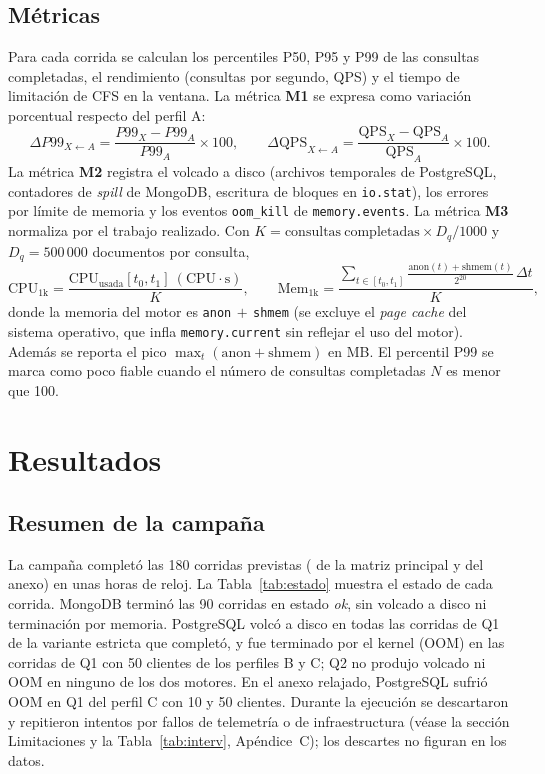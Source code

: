 \documentclass[12pt,letterpaper]{article}
\newcommand{\code}[1]{\texttt{#1}}
\newcommand{\Mongo}{MongoDB}
\newcommand{\PG}{PostgreSQL}
\begin{document}
\subsection{Métricas}
Para cada corrida se calculan los percentiles P50, P95 y P99 de las consultas completadas, el rendimiento
(consultas por segundo, QPS) y el tiempo de limitación de CFS en la ventana. La métrica \textbf{M1}
se expresa como variación porcentual respecto del perfil A:
\begin{equation}
\Delta P99_{X\leftarrow A}=\frac{P99_X-P99_A}{P99_A}\times 100,\qquad
\Delta\mathrm{QPS}_{X\leftarrow A}=\frac{\mathrm{QPS}_X-\mathrm{QPS}_A}{\mathrm{QPS}_A}\times 100.
\end{equation}
La métrica \textbf{M2} registra el volcado a disco (archivos temporales de \PG{}, contadores de \textit{spill} de
\Mongo{}, escritura de bloques en \code{io.stat}), los errores por límite de memoria y los eventos \code{oom\_kill}
de \code{memory.events}. La métrica \textbf{M3} normaliza por el trabajo realizado. Con $K=\mathrm{consultas\ completadas}\times D_q/1000$
y $D_q=500\,000$ documentos por consulta,
\begin{equation}
\mathrm{CPU}_{1\mathrm{k}}=\frac{\mathrm{CPU}_{\mathrm{usada}}[t_0,t_1]\ (\mathrm{CPU{\cdot}s})}{K},\qquad
\mathrm{Mem}_{1\mathrm{k}}=\frac{\sum_{t\in[t_0,t_1]}\frac{\mathrm{anon}(t)+\mathrm{shmem}(t)}{2^{20}}\,\Delta t}{K},
\end{equation}
donde la memoria del motor es \code{anon}$\,+\,$\code{shmem} (se excluye el \textit{page cache} del sistema operativo, que
infla \code{memory.current} sin reflejar el uso del motor). Además se reporta el pico $\max_t(\mathrm{anon}+\mathrm{shmem})$ en MB.
El percentil P99 se marca como poco fiable cuando el número de consultas completadas $N$ es menor que 100.

\section{Resultados}
\subsection{Resumen de la campaña}
La campaña completó las 180 corridas previstas ( de la matriz principal y  del anexo)
en unas  horas de reloj. La Tabla~\ref{tab:estado} muestra el estado de cada corrida. \Mongo{} terminó
las 90 corridas en estado \textit{ok}, sin volcado a disco ni terminación por memoria. \PG{} volcó a disco en todas
las corridas de Q1 de la variante estricta que completó, y fue terminado por el kernel (OOM) en las corridas de Q1 con 50 clientes de los perfiles B y C;
Q2 no produjo volcado ni OOM en ninguno de los dos motores. En el anexo relajado, \PG{} sufrió OOM en Q1 del perfil C con 10 y 50 clientes. Durante la
ejecución se descartaron y repitieron  intentos por fallos de telemetría o de infraestructura (véase la sección Limitaciones y la
Tabla~\ref{tab:interv}, Apéndice~C); los descartes no figuran en los datos.
\end{document}
